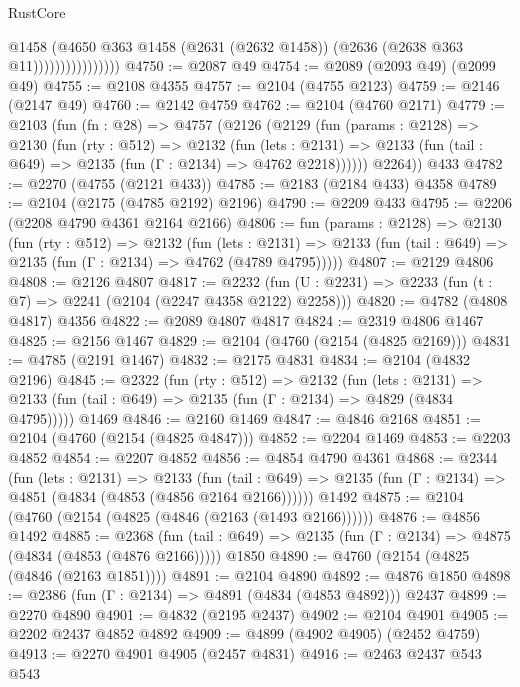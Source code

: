 \begin{lexlean}{RustCore}
\begin{coremodule}
                              @1458
                              (@4650
                                @363
                                @1458
                                (@2631 (@2632 @1458))
                                (@2636 (@2638 @363 @11))))))))))))))))
@4750 := @2087 @49
@4754 := @2089 (@2093 @49) (@2099 @49)
@4755 := @2108 @4355
@4757 := @2104 (@4755 @2123)
@4759 := @2146 (@2147 @49)
@4760 := @2142 @4759
@4762 := @2104 (@4760 @2171)
@4779 := @2103
    (fun (fn : @28) =>
    @4757
      (@2126
        (@2129
          (fun (params : @2128) =>
          @2130
            (fun (rty : @512) =>
            @2132
              (fun (lets : @2131) =>
              @2133 (fun (tail : @649) => @2135 (fun (Γ : @2134) => @4762 @2218))))))
        @2264))
    @433
@4782 := @2270 (@4755 (@2121 @433))
@4785 := @2183 (@2184 @433) @4358
@4789 := @2104 (@2175 (@4785 @2192) @2196)
@4790 := @2209 @433
@4795 := @2206 (@2208 @4790 @4361 @2164 @2166)
@4806 := fun (params : @2128) =>
  @2130
    (fun (rty : @512) =>
    @2132
      (fun (lets : @2131) =>
      @2133 (fun (tail : @649) => @2135 (fun (Γ : @2134) => @4762 (@4789 @4795)))))
@4807 := @2129 @4806
@4808 := @2126 @4807
@4817 := @2232 (fun (U : @2231) => @2233 (fun (t : @7) => @2241 (@2104 (@2247 @4358 @2122) @2258)))
@4820 := @4782 (@4808 @4817) @4356
@4822 := @2089 @4807 @4817
@4824 := @2319 @4806 @1467
@4825 := @2156 @1467
@4829 := @2104 (@4760 (@2154 (@4825 @2169)))
@4831 := @4785 (@2191 @1467)
@4832 := @2175 @4831
@4834 := @2104 (@4832 @2196)
@4845 := @2322
    (fun (rty : @512) =>
    @2132
      (fun (lets : @2131) =>
      @2133 (fun (tail : @649) => @2135 (fun (Γ : @2134) => @4829 (@4834 @4795)))))
    @1469
@4846 := @2160 @1469
@4847 := @4846 @2168
@4851 := @2104 (@4760 (@2154 (@4825 @4847)))
@4852 := @2204 @1469
@4853 := @2203 @4852
@4854 := @2207 @4852
@4856 := @4854 @4790 @4361
@4868 := @2344
    (fun (lets : @2131) =>
    @2133
      (fun (tail : @649) => @2135 (fun (Γ : @2134) => @4851 (@4834 (@4853 (@4856 @2164 @2166))))))
    @1492
@4875 := @2104 (@4760 (@2154 (@4825 (@4846 (@2163 (@1493 @2166))))))
@4876 := @4856 @1492
@4885 := @2368
    (fun (tail : @649) => @2135 (fun (Γ : @2134) => @4875 (@4834 (@4853 (@4876 @2166)))))
    @1850
@4890 := @4760 (@2154 (@4825 (@4846 (@2163 @1851))))
@4891 := @2104 @4890
@4892 := @4876 @1850
@4898 := @2386 (fun (Γ : @2134) => @4891 (@4834 (@4853 @4892))) @2437
@4899 := @2270 @4890
@4901 := @4832 (@2195 @2437)
@4902 := @2104 @4901
@4905 := @2202 @2437 @4852 @4892
@4909 := @4899 (@4902 @4905) (@2452 @4759)
@4913 := @2270 @4901 @4905 (@2457 @4831)
@4916 := @2463 @2437 @543 @543

\end{coremodule}
\end{lexlean}
